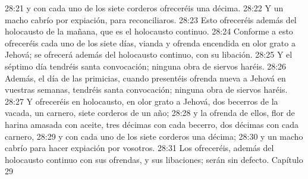 28:21 y con cada uno de los siete corderos ofreceréis una décima.  
28:22 Y un macho cabrío por expiación, para reconciliaros.  
28:23 Esto ofreceréis además del holocausto de la mañana, que es el holocausto continuo.  
28:24 Conforme a esto ofreceréis cada uno de los siete días, vianda y ofrenda encendida en olor grato a Jehová; se ofrecerá además del holocausto continuo, con su libación.  
28:25 Y el séptimo día tendréis santa convocación; ninguna obra de siervos haréis.  
28:26 Además, el día de las primicias, cuando presentéis ofrenda nueva a Jehová en vuestras semanas, tendréis santa convocación; ninguna obra de siervos haréis.  
28:27 Y ofreceréis en holocausto, en olor grato a Jehová, dos becerros de la vacada, un carnero, siete corderos de un año;  
28:28 y la ofrenda de ellos, flor de harina amasada con aceite, tres décimas con cada becerro, dos décimas con cada carnero,  
28:29 y con cada uno de los siete corderos una décima;  
28:30 y un macho cabrío para hacer expiación por vosotros.  
28:31 Los ofreceréis, además del holocausto continuo con sus ofrendas, y sus libaciones; serán sin defecto.  
Capítulo 29 

